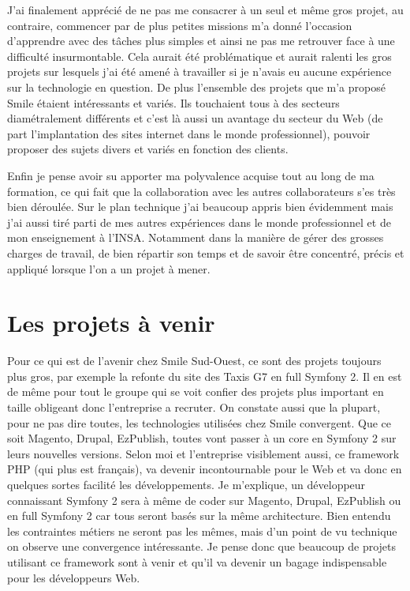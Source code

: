 \documentclass[a4paper,11pt,twoside]{report}
\begin{document}
  J'ai finalement apprécié de ne pas me consacrer à un seul et même gros projet, au contraire, commencer par de plus petites missions m'a donné l'occasion d'apprendre avec des tâches plus simples et ainsi ne pas me retrouver face à une difficulté insurmontable. Cela aurait été problématique et aurait ralenti les gros projets sur lesquels j'ai été amené à travailler si je n'avais eu aucune expérience sur la technologie en question. De plus l'ensemble des projets que m'a proposé Smile étaient intéressants et variés. Ils touchaient tous à des secteurs diamétralement différents et c'est là aussi un avantage du secteur du Web (de part l'implantation des sites internet dans le monde professionnel), pouvoir proposer des sujets divers et variés en fonction des clients.
  
  Enfin je pense avoir su apporter ma polyvalence acquise tout au long de ma formation, ce qui fait que la collaboration avec les autres collaborateurs s'es très bien déroulée. Sur le plan technique j'ai beaucoup appris bien évidemment mais j'ai aussi tiré parti de mes autres expériences dans le monde professionnel et de mon enseignement à l'INSA. Notamment dans la manière de gérer des grosses charges de travail, de bien répartir son temps et de savoir être concentré, précis et appliqué lorsque l'on a un projet à mener.
  \section*{Les projets à venir}
  Pour ce qui est de l'avenir chez Smile Sud-Ouest, ce sont des projets toujours plus gros, par exemple la refonte du site des Taxis G7 en full Symfony 2. Il en est de même pour tout le groupe qui se voit confier des projets plus important en taille obligeant donc l'entreprise a recruter. On constate aussi que la plupart, pour ne pas dire toutes, les technologies utilisées chez Smile convergent. Que ce soit Magento, Drupal, EzPublish, toutes vont passer à un core en Symfony 2 sur leurs nouvelles versions. Selon moi et l'entreprise visiblement aussi, ce framework PHP (qui plus est français), va devenir incontournable pour le Web et va donc en quelques sortes facilité les développements. Je m'explique, un développeur connaissant Symfony 2 sera à même de coder sur Magento, Drupal, EzPublish ou en full Symfony 2 car tous seront basés sur la même architecture. Bien entendu les contraintes métiers ne seront pas les mêmes, mais d'un point de vu technique on observe une convergence intéressante. Je pense donc que beaucoup de projets utilisant ce framework sont à venir et qu'il va devenir un bagage indispensable pour les développeurs Web.
  
\end{document}
